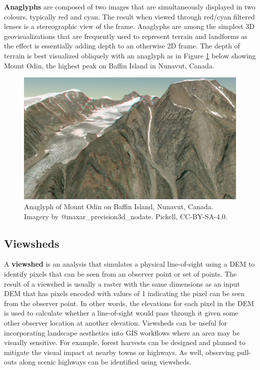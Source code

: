 \documentclass[
]{book}
\begin{document}
\textbf{Anaglyphs} are composed of two images that are simultaneously displayed in two colours, typically red and cyan. The result when viewed through red/cyan filtered lenses is a stereographic view of the frame. Anaglyphs are among the simplest 3D geovisualizations that are frequently used to represent terrain and landforms as the effect is essentially adding depth to an otherwise 2D frame. The depth of terrain is best visualized obliquely with an anaglyph as in Figure \ref{fig:9-baffin-island-mount-odin-1} below showing Mount Odin, the highest peak on Baffin Island in Nunavut, Canada.

\begin{figure}
\includegraphics[width=0.75\linewidth]{images/09-baffin-island-mount-odin-1} \caption{Anaglyph of Mount Odin on Baffin Island, Nunavut, Canada. Imagery by @maxar_precision3d_nodate. Pickell, CC-BY-SA-4.0.}\label{fig:9-baffin-island-mount-odin-1}
\end{figure}

\hypertarget{viewsheds}{%
\subsection{Viewsheds}\label{viewsheds}}

A \textbf{viewshed} is an analysis that simulates a physical line-of-sight using a DEM to identify pixels that can be seen from an observer point or set of points. The result of a viewshed is usually a raster with the same dimensions as an input DEM that has pixels encoded with values of 1 indicating the pixel can be seen from the observer point. In other words, the elevations for each pixel in the DEM is used to calculate whether a line-of-sight would pass through it given some other observer location at another elevation. Viewsheds can be useful for incorporating landscape aesthetics into GIS workflows where an area may be visually sensitive. For example, forest harvests can be designed and planned to mitigate the visual impact at nearby towns or highways. As well, observing pull-outs along scenic highways can be identified using viewsheds.
\end{document}
